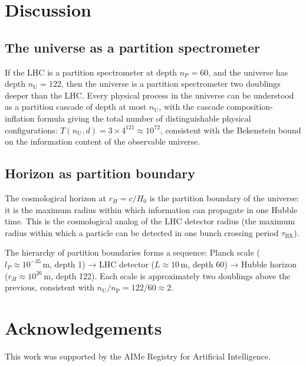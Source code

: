 \documentclass[twocolumn,10pt,a4paper]{article}
\theoremstyle{thmstyle}
\theoremstyle{definition}
\theoremstyle{remark}
\newcommand{\nP}{n_{\mathrm{P}}}
\newcommand{\nU}{n_{\mathrm{U}}}
\newcommand{\tBX}{\tau_{\mathrm{BX}}}
\begin{document}
\section{Discussion}
\label{sec:disc}

\subsection{The universe as a partition spectrometer}

If the LHC is a partition spectrometer at depth $\nP = 60$, and the
universe has depth $\nU = 122$, then the universe is a partition
spectrometer two doublings deeper than the LHC. Every physical process
in the universe can be understood as a partition cascade of depth at
most $\nU$, with the cascade composition-inflation formula giving the
total number of distinguishable physical configurations:
$T(\nU, d) = 3\times4^{121} \approx 10^{72}$, consistent with the
Bekenstein bound on the information content of the observable universe.

\subsection{Horizon as partition boundary}

The cosmological horizon at $r_H = c/H_0$ is the partition boundary
of the universe: it is the maximum radius within which information can
propagate in one Hubble time. This is the cosmological analog of the
LHC detector radius (the maximum radius within which a particle can
be detected in one bunch crossing period $\tBX$).

The hierarchy of partition boundaries forms a sequence:
Planck scale ($l_P \approx 10^{-35}\,\mathrm{m}$, depth 1) →
LHC detector ($L \approx 10\,\mathrm{m}$, depth 60) →
Hubble horizon ($r_H \approx 10^{26}\,\mathrm{m}$, depth 122).
Each scale is approximately two doublings above the previous,
consistent with $\nU/\nP = 122/60 \approx 2$.

\section*{Acknowledgements}
This work was supported by the AIMe Registry for Artificial Intelligence.



\end{document}
